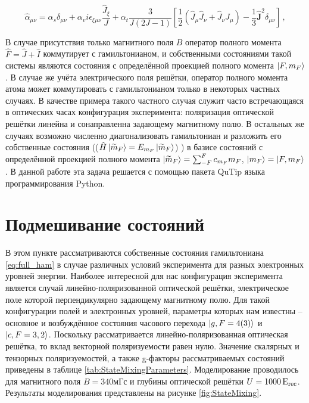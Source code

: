 \begin{equation} \label{eq:tensor}
	\hat{\alpha}_{\mu\nu} = \alpha_s\delta_{\mu\nu}
	+\alpha_v i \epsilon_{\xi\mu\nu}\frac{\hat{J}_\xi}{J}
	+\alpha_t\frac{3}{J(2J-1)}\left[ \frac{1}{2}(\hat{J}_\mu \hat{J}_\nu + \hat{J}_\nu \hat{J}_\mu) - \frac{1}{3}\hat{\mathbf{J}}^2\delta_{\mu\nu} \right]\,,
\end{equation}

В случае присутствия только магнитного поля $B$ оператор полного момента $\hat{F} = \hat{J} + \hat{I}$ коммутирует с гамильтонианом, и собственными состояниями такой системы являются состояния с определённой проекцией полного момента $\ket{F, m_F}$.
В случае же учёта электрического поля решётки, оператор полного момента атома может коммутировать с гамильтонианом только в некоторых частных случаях.
В качестве примера такого частного случая служит часто встречающаяся в оптических часах конфигурация эксперимента: поляризация оптической решётки линейна и сонаправленна задающему магнитному полю.
В остальных же случаях возможно численно диагонализовать гамильтониан и разложить его собственные состояния (($\hat{H}\ket{\widetilde{m}_F}=E_{m_F}\ket{\widetilde{m}_F}$) \cite{virgo2013simultaneous}) в базисе состояний с определённой проекцией полного момента $\ket{\widetilde{m}_F} = \sum_{-F}^{F}c_{m_F} m_F$, $\ket{m_F}=\ket{F, m_F}$.
В данной работе эта задача решается с помощью пакета QuTip \cite{lambert2024qutip5quantumtoolbox} языка программирования Python.

\section{Подмешивание состояний}
В этом пункте рассматриваются собственные состояния гамильтониана \ref{eq:full_ham} в случае различных условий эксперимента для разных электронных уровней энергии.
Наиболее интересной для нас конфигурация эксперимента является случай линейно-поляризованной оптической решётки, электрическое поле которой перпендикулярно задающему магнитному полю.
Для такой конфигурации полей и электронных уровней, параметры которых нам известны -- основное и возбуждённое состояния часового перехода $\ket{g, F = 4(3)}$ и $\ket{c, F = 3, 2}$. %
Поскольку рассматривается линейно-поляризованная оптическая решётка, то вклад векторной поляризуемости равен нулю. 
Значение скалярных и тензорных поляризуемостей, а также g-факторы рассматриваемых состояний приведены в таблице \ref{tab:StateMixingParameters}. 
Моделирование проводилось для магнитного поля $B = 340\unit{мГс}$ и глубины оптической решётки $U = 1000\,\textrm{E}_{\text{rec}}$. 
Результаты моделирования представлены на рисунке \ref{fig:StateMixing}.


